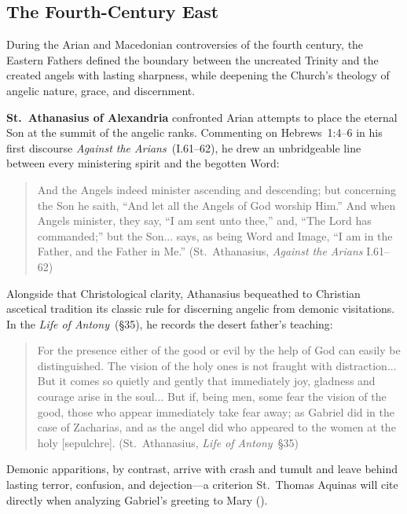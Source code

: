 \subsection{The Fourth-Century East}
\label{subsec:fourth-century-east}

During the Arian and Macedonian controversies of the fourth century, the Eastern Fathers defined the boundary between the uncreated Trinity and the created angels with lasting sharpness, while deepening the Church's theology of angelic nature, grace, and discernment.

\textbf{St.~Athanasius of Alexandria} confronted Arian attempts to place the eternal Son at the summit of the angelic ranks. Commenting on Hebrews~1:4--6 in his first discourse \emph{Against the Arians}~(I.61--62), he drew an unbridgeable line between every ministering spirit and the begotten Word:
\begin{quotation}
And the Angels indeed minister ascending and descending; but concerning the Son he saith, ``And let all the Angels of God worship Him.'' And when Angels minister, they say, ``I am sent unto thee,'' and, ``The Lord has commanded;'' but the Son... says, as being Word and Image, ``I am in the Father, and the Father in Me.'' (St.~Athanasius, \emph{Against the Arians} I.61--62)
\end{quotation}
Alongside that Christological clarity, Athanasius bequeathed to Christian ascetical tradition its classic rule for discerning angelic from demonic visitations. In the \emph{Life of Antony}~(\S 35), he records the desert father's teaching:
\begin{quotation}
For the presence either of the good or evil by the help of God can easily be distinguished. The vision of the holy ones is not fraught with distraction... But it comes so quietly and gently that immediately joy, gladness and courage arise in the soul... But if, being men, some fear the vision of the good, those who appear immediately take fear away; as Gabriel did in the case of Zacharias, and as the angel did who appeared to the women at the holy [sepulchre]. (St.~Athanasius, \emph{Life of Antony}~\S 35)
\end{quotation}
Demonic apparitions, by contrast, arrive with crash and tumult and leave behind lasting terror, confusion, and dejection---a criterion St.~Thomas Aquinas will cite directly when analyzing Gabriel's greeting to Mary ().

